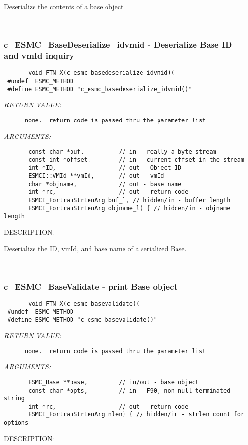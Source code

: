        Deserialize the contents of a base object.
   
 
\mbox{}\hrulefill\
 
\subsubsection [c\_ESMC\_BaseDeserialize\_idvmid] {c\_ESMC\_BaseDeserialize\_idvmid - Deserialize Base ID and vmId inquiry}


  
\begin{verbatim}       void FTN_X(c_esmc_basedeserialize_idvmid)(
 #undef  ESMC_METHOD
 #define ESMC_METHOD "c_esmc_basedeserialize_idvmid()"\end{verbatim}{\em RETURN VALUE:}
\begin{verbatim}      none.  return code is passed thru the parameter list\end{verbatim}{\em ARGUMENTS:}
\begin{verbatim}       const char *buf,          // in - really a byte stream
       const int *offset,        // in - current offset in the stream
       int *ID,                  // out - Object ID
       ESMCI::VMId **vmId,       // out - vmId
       char *objname,            // out - base name
       int *rc,                  // out - return code
       ESMCI_FortranStrLenArg buf_l, // hidden/in - buffer length
       ESMCI_FortranStrLenArg objname_l) { // hidden/in - objname length\end{verbatim}
{\sf DESCRIPTION:\\ }


       Deserialize the ID, vmId, and base name of a serialized Base.
   
 
\mbox{}\hrulefill\ 
 
\subsubsection [c\_ESMC\_BaseValidate] {c\_ESMC\_BaseValidate - print Base object }


  
\begin{verbatim}       void FTN_X(c_esmc_basevalidate)(
 #undef  ESMC_METHOD
 #define ESMC_METHOD "c_esmc_basevalidate()"\end{verbatim}{\em RETURN VALUE:}
\begin{verbatim}      none.  return code is passed thru the parameter list
   \end{verbatim}{\em ARGUMENTS:}
\begin{verbatim}       ESMC_Base **base,         // in/out - base object
       const char *opts,         // in - F90, non-null terminated string
       int *rc,                  // out - return code
       ESMCI_FortranStrLenArg nlen) { // hidden/in - strlen count for options
   \end{verbatim}
{\sf DESCRIPTION:\\ }


